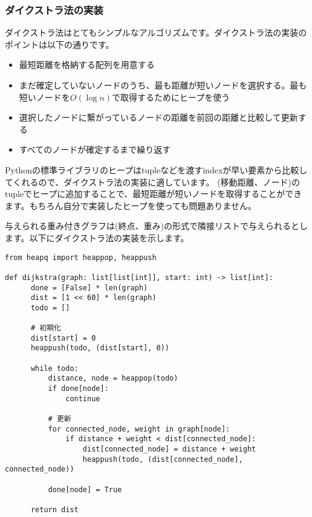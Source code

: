 \vspace{0.5cm}

\subsubsection{ダイクストラ法の実装}
ダイクストラ法はとてもシンプルなアルゴリズムです。ダイクストラ法の実装のポイントは以下の通りです。

\begin{itemize}
  \item 最短距離を格納する配列を用意する
  \item まだ確定していないノードのうち、最も距離が短いノードを選択する。最も短いノードを$O(\log n)$で取得するためにヒープを使う
  \item 選択したノードに繋がっているノードの距離を前回の距離と比較して更新する
  \item すべてのノードが確定するまで繰り返す
\end{itemize}

Pythonの標準ライブラリのヒープはtupleなどを渡すindexが早い要素から比較してくれるので、ダイクストラ法の実装に適しています。
(移動距離、ノード)のtupleでヒープに追加することで、最短距離が短いノードを取得することができます。もちろん自分で実装したヒープを使っても問題ありません。

与えられる重み付きグラフは(終点、重み)の形式で隣接リストで与えられるとします。以下にダイクストラ法の実装を示します。
\begin{lstlisting}[caption=ダイクストラ法の実装, label=dijkstra, frame=TRBL, label={dijkstra}]
from heapq import heappop, heappush

def dijkstra(graph: list[list[int]], start: int) -> list[int]:
      done = [False] * len(graph)
      dist = [1 << 60] * len(graph)
      todo = []
      
      # 初期化
      dist[start] = 0
      heappush(todo, (dist[start], 0))
      
      while todo:
          distance, node = heappop(todo)
          if done[node]:
              continue
          
          # 更新
          for connected_node, weight in graph[node]:
              if distance + weight < dist[connected_node]:
                  dist[connected_node] = distance + weight
                  heappush(todo, (dist[connected_node], connected_node))
          
          done[node] = True
      
      return dist
                  
\end{lstlisting}

